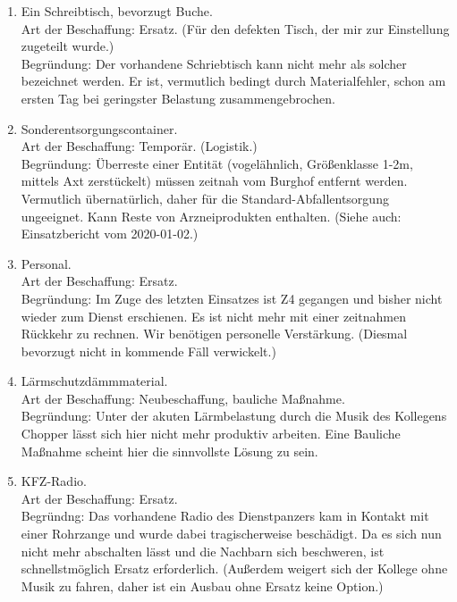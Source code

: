 \documentclass[final]{multiversum}
\begin{document}
\begin{enumerate}[leftmargin=*, itemsep=1ex]
  \item Ein Schreibtisch, bevorzugt Buche. \\
    Art der Beschaffung: Ersatz. (Für den defekten Tisch, der mir zur Einstellung zugeteilt wurde.) \\
    Begründung:
      Der vorhandene Schriebtisch kann nicht mehr als solcher bezeichnet werden.
      Er ist, vermutlich bedingt durch Materialfehler, schon am ersten Tag bei geringster Belastung zusammengebrochen.

  \item Sonderentsorgungscontainer. \\
    Art der Beschaffung: Temporär. (Logistik.) \\%
    Begründung:
      Überreste einer Entität (vogelähnlich, Größenklasse 1-2m, mittels Axt zerstückelt) müssen zeitnah vom Burghof entfernt werden.
      Vermutlich übernatürlich, daher für die Standard-Abfallentsorgung ungeeignet.
      Kann Reste von Arzneiprodukten enthalten.
      (Siehe auch: Einsatzbericht vom 2020-01-02.)

  \item Personal. \\
    Art der Beschaffung: Ersatz. \\
    Begründung:
      Im Zuge des letzten Einsatzes ist Z4 gegangen und bisher nicht wieder zum Dienst erschienen.
      Es ist nicht mehr mit einer zeitnahmen Rückkehr zu rechnen.
      Wir benötigen personelle Verstärkung.
      (Diesmal bevorzugt nicht in kommende Fäll verwickelt.)

  \item Lärmschutzdämmmaterial. \\
    Art der Beschaffung: Neubeschaffung, bauliche Maßnahme. \\
    Begründung:
      Unter der akuten Lärmbelastung durch die Musik des Kollegens Chopper lässt sich hier nicht mehr produktiv arbeiten.
      Eine Bauliche Maßnahme scheint hier die sinnvollste Lösung zu sein.

  \item KFZ-Radio. \\
    Art der Beschaffung: Ersatz. \\
    Begründng:
      Das vorhandene Radio des Dienstpanzers kam in Kontakt mit einer Rohrzange und wurde dabei tragischerweise beschädigt.
      Da es sich nun nicht mehr abschalten lässt und die Nachbarn sich beschweren, ist schnellstmöglich Ersatz erforderlich.
      (Außerdem weigert sich der Kollege ohne Musik zu fahren, daher ist ein Ausbau ohne Ersatz keine Option.)
\end{enumerate}
\end{document}

